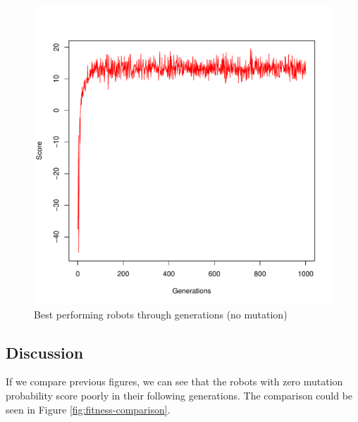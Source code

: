 \documentclass{article}
\begin{document}
\begin{figure}[h!]
\centering
\includegraphics[scale=0.56]{figure-2.pdf}
\caption{Best performing robots through generations (no mutation)}
\label{fig:fitness-no-mutation}
\end{figure}

\clearpage

\subsection{Discussion}
If we compare previous figures, we can see that the robots with zero mutation probability score poorly in their following generations. The comparison could be seen in Figure \ref{fig:fitness-comparison}.
\end{document}
